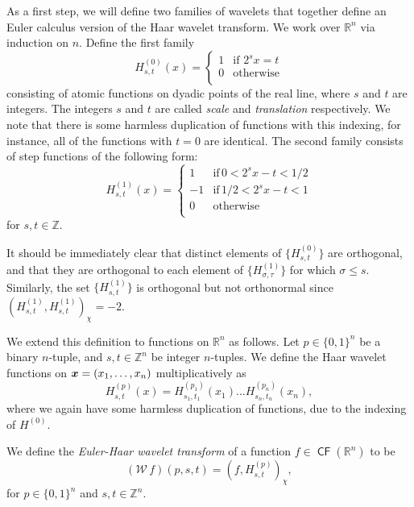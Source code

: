\documentclass{psapm-l}
\theoremstyle{definition}
\theoremstyle{remark}
\numberwithin{equation}{section}
\begin{document}
As a first step, we will define two families of wavelets that together define an Euler calculus version of the Haar wavelet transform.
We work over ${{\mathbb R}}^n$ via induction on $n$. Define the first family
\begin{equation}
    H^{(0)}_{s,t}(x)=
    \begin{cases}
        1&\text{if }2^sx=t\\
        0&\text{otherwise}\\
    \end{cases}
\end{equation}
consisting of atomic functions on dyadic points of the real line, where $s$ and $t$ are integers.  The integers $s$ and $t$ are called {\it scale} and {\it translation} respectively.  We note that there is some harmless duplication of functions with this indexing, for instance, all of the functions with $t=0$ are identical.  The second family consists of step functions of the following form:
\begin{equation}
H^{(1)}_{s,t}(x)=
\begin{cases}
    1&\text{if} \, 0<2^sx-t<1/2\\
    -1&\text{if} \, 1/2<2^sx-t<1\\
    0&\text{otherwise}\\
\end{cases}
\end{equation}
for $s,t\in{{\mathbb Z}}$.

It should be immediately clear that distinct elements of $\{H^{(0)}_{s,t}\}$ are orthogonal, and that they are orthogonal to each element of $\{H^{(1)}_{\sigma,\tau}\}$ for which $\sigma \le s$. Similarly, the set $\{H^{(1)}_{s,t}\}$ is orthogonal but not orthonormal since $(H^{(1)}_{s,t},H^{(1)}_{s,t})_\chi=-2$.

We extend this definition to functions on ${{\mathbb R}}^n$ as follows. Let $p\in\{0,1\}^n$ be a binary $n$-tuple, and $s,t\in{{\mathbb Z}}^n$ be integer $n$-tuples.  We define the Haar wavelet functions on ${\mbox{\boldmath $x$}}=(x_1,\ldots,x_n)$ multiplicatively as
\begin{equation}
    H^{(p)}_{s,t}(x)=H^{(p_1)}_{s_1,t_1}(x_1) ... H^{(p_n)}_{s_n,t_n}(x_n),
\end{equation}
where we again have some harmless duplication of functions, due to the indexing of $H^{(0)}$.

We define the {\it Euler-Haar wavelet transform} of a function $f\in {{{\operatorname{\mathsf{{CF}}}}}}({{\mathbb R}}^n)$ to be
\begin{equation}
    ({{\mathcal W}}\,f)(p,s,t)=(f,H^{(p)}_{s,t})_\chi,
\end{equation}
for $p\in\{0,1\}^n$ and $s,t\in{{\mathbb Z}}^n$.
\end{document}
